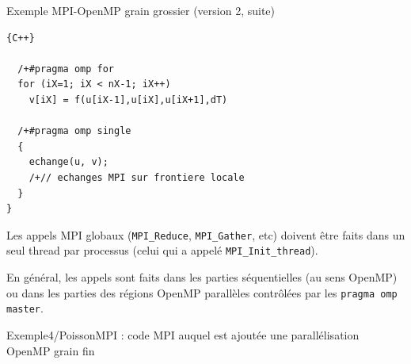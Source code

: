 \documentclass{beamer}
\begin{document}
\begin{frame}[fragile]
	Exemple MPI-OpenMP grain grossier (version 2, suite)
	
	
	\begin{lstlisting}[firstnumber=14]{C++}
	
  /+#pragma omp for
  for (iX=1; iX < nX-1; iX++)
    v[iX] = f(u[iX-1],u[iX],u[iX+1],dT)

  /+#pragma omp single
  {
    echange(u, v);
    /+// echanges MPI sur frontiere locale    
  }
}
\end{lstlisting}
	
\end{frame}

\begin{frame}
	Les appels MPI globaux (\texttt{MPI\_Reduce}, \texttt{MPI\_Gather}, etc)
	doivent être faits dans un seul thread par processus (celui qui a appelé \texttt{MPI\_Init\_thread}).
	
	\bigskip
	En général, les appels sont faits dans les parties séquentielles (au sens OpenMP) ou dans les parties des régions OpenMP parallèles contrôlées par les \texttt{pragma omp master}. 
\end{frame}

\begin{frame}
Exemple4/PoissonMPI : code MPI auquel est ajoutée une parallélisation OpenMP grain fin
\end{frame}
\end{document}
